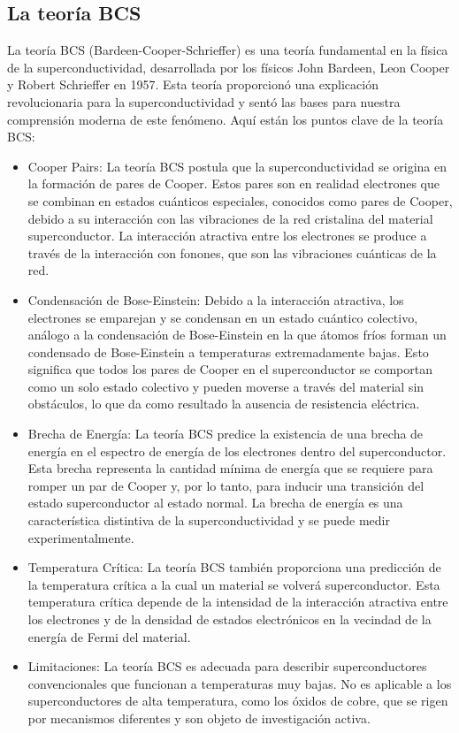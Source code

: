 \documentclass[10.5pt]{article}
\begin{document}
    \subsection{La teoría BCS}
    La teoría BCS (Bardeen-Cooper-Schrieffer) es una teoría fundamental en la física de la superconductividad, desarrollada por los físicos John Bardeen, Leon Cooper y Robert Schrieffer en 1957. Esta teoría proporcionó una explicación revolucionaria para la superconductividad y sentó las bases para nuestra comprensión moderna de este fenómeno. Aquí están los puntos clave de la teoría BCS:
    \begin{itemize}
        \item Cooper Pairs: La teoría BCS postula que la superconductividad se origina en la formación de pares de Cooper. Estos pares son en realidad electrones que se combinan en estados cuánticos especiales, conocidos como pares de Cooper, debido a su interacción con las vibraciones de la red cristalina del material superconductor. La interacción atractiva entre los electrones se produce a través de la interacción con fonones, que son las vibraciones cuánticas de la red.
        \item Condensación de Bose-Einstein: Debido a la interacción atractiva, los electrones se emparejan y se condensan en un estado cuántico colectivo, análogo a la condensación de Bose-Einstein en la que átomos fríos forman un condensado de Bose-Einstein a temperaturas extremadamente bajas. Esto significa que todos los pares de Cooper en el superconductor se comportan como un solo estado colectivo y pueden moverse a través del material sin obstáculos, lo que da como resultado la ausencia de resistencia eléctrica.
        \item Brecha de Energía: La teoría BCS predice la existencia de una brecha de energía en el espectro de energía de los electrones dentro del superconductor. Esta brecha representa la cantidad mínima de energía que se requiere para romper un par de Cooper y, por lo tanto, para inducir una transición del estado superconductor al estado normal. La brecha de energía es una característica distintiva de la superconductividad y se puede medir experimentalmente.
        \item Temperatura Crítica: La teoría BCS también proporciona una predicción de la temperatura crítica a la cual un material se volverá superconductor. Esta temperatura crítica depende de la intensidad de la interacción atractiva entre los electrones y de la densidad de estados electrónicos en la vecindad de la energía de Fermi del material.
        \item Limitaciones: La teoría BCS es adecuada para describir superconductores convencionales que funcionan a temperaturas muy bajas. No es aplicable a los superconductores de alta temperatura, como los óxidos de cobre, que se rigen por mecanismos diferentes y son objeto de investigación activa.
    \end{itemize}
\end{document}
